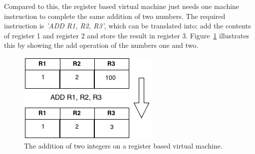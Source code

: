 \newpage
Compared to this, the register based virtual machine just needs one machine instruction to complete the same addition of two numbers.
The required instruction is \textit{'ADD R1, R2, R3'}, which can be translated into: add the contents of register 1 and register 2 and store the result in register 3.
Figure~\ref{fig:register-based-addition} illustrates this by showing the add operation of the numbers one and two.
\begin{figure}[h]
\begin{center}
\includegraphics[scale=0.65]{images/register-based-addition.png} 
\caption{The addition of two integers on a register based virtual machine.}
\label{fig:register-based-addition}
\end{center}
\end{figure}

